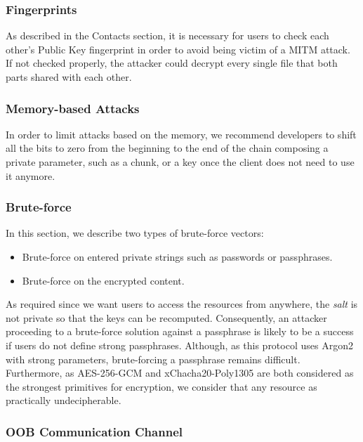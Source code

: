 \documentclass[a4paper,9pt,twoside]{article}
\begin{document}
\subsubsection{Fingerprints}

    As described in the Contacts section, it is necessary for users to check each other's 
Public Key fingerprint in order to avoid being victim of a MITM attack. If not checked properly, 
the attacker could decrypt every single file that both parts shared with each other.

\subsubsection{Memory-based Attacks}

    In order to limit attacks based on the memory, we recommend developers to shift all the bits 
to zero from the beginning to the end of the chain composing a private parameter, such as a chunk, 
or a key once the client does not need to use it anymore.

\subsubsection{Brute-force}

     In this section, we describe two types of brute-force vectors:

\begin{itemize}
\itemsep0em
\item Brute-force on entered private strings such as passwords or passphrases.
\item Brute-force on the encrypted content.
\end{itemize}

    As required since we want users to access the resources from anywhere, 
the \emph{salt} is not private so that the keys can be recomputed. Consequently, an attacker proceeding to 
a brute-force solution against a passphrase is likely to be a success if users 
do not define strong passphrases. Although, as this protocol uses Argon2 with 
strong parameters, brute-forcing a passphrase remains difficult. Furthermore, as 
AES-256-GCM and xChacha20-Poly1305 are both considered as the strongest primitives 
for encryption, we consider that any resource as practically undecipherable.

\subsubsection{OOB Communication Channel}
\end{document}

